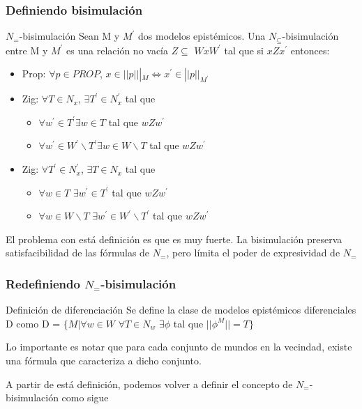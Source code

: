 \documentclass{beamer}
\begin{document}
\begin{frame}
\frametitle{Definiendo bisimulaci\'on}

\begin{block}{$N_{=}$-bisimulaci\'on}
Sean M y $M^{'}$ dos modelos epist\'emicos. Una $N_{\subseteq}$-bisimulaci\'on entre M y $M^{'}$ es una relaci\'on no vac\'ia $Z \subseteq$ $WxW^{'}$ tal que si $xZx^{'}$ entonces:
\begin{itemize}
\item Prop: $\forall p \in PROP$, $x \in ||p|||_{M} \iff x^{'} \in ||p||_{M^{'}}$
\item Zig: $\forall T \in N_{x}$, $\exists T^{'} \in N^{'}_{x}$ tal que 
\begin{itemize}
\item $\forall w^{'} \in T^{'} \exists w \in T$ tal que $wZw^{'}$
\item $\forall w^{'} \in W^{'}\backslash T^{'} \exists w \in W\backslash T$ tal que $wZw^{'}$
\end{itemize}
\item Zig: $\forall T^{'} \in N_{x}^{'}$, $\exists T \in N_{x}$ tal que 
\begin{itemize}
\item $\forall w \in T$ $\exists w^{'} \in T^{'}$ tal que $wZw^{'}$
\item $\forall w \in W\backslash T$ $\exists w^{'} \in W^{'}\backslash T^{'}$ tal que $wZw^{'}$
\end{itemize}  
\end{itemize}
\end{block}

El problema con est\'a definici\'on es que es muy fuerte. La bisimulaci\'on preserva satisfacibilidad de las f\'ormulas de $N_{=}$, pero l\'imita el poder de expresividad de $N_{=}$

\end{frame}

\begin{frame}
\frametitle{Redefiniendo $N_{=}$-bisimulaci\'on}

\begin{block}{Definici\'on de diferenciaci\'on}
Se define la clase de modelos epist\'emicos diferenciales D como 
D = $\{M | \forall w \in W$ $\forall T \in N_{w}$ $\exists \phi$ tal que $||\phi^{M}|| = T\}$
\end{block}
Lo importante es notar que para cada conjunto de mundos en la vecindad, existe una f\'ormula que caracteriza a dicho conjunto.

A partir de est\'a definici\'on, podemos volver a definir el concepto de $N_{=}$-bisimulaci\'on como sigue

\end{frame}
\end{document}

